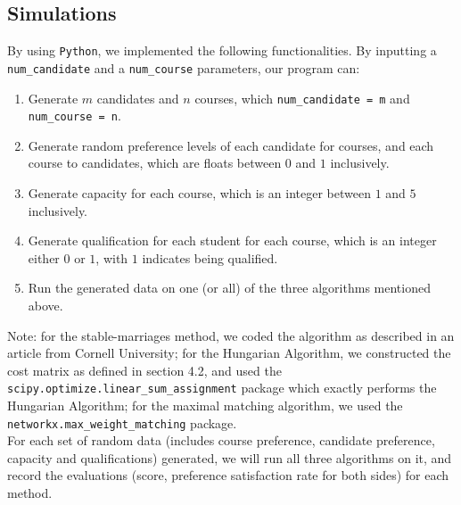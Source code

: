 \documentclass[twoside,twocolumn]{article}
\begin{document}
    \subsection{Simulations}
    By using \verb|Python|, we implemented the following functionalities. 
    By inputting a \verb|num_candidate| and a \verb|num_course| parameters, our program can:
    \begin{enumerate}
        \item Generate $m$ candidates and $n$ courses, which \verb|num_candidate = m| and \verb|num_course = n|.
        \item Generate random preference levels of each candidate for courses, and each course to candidates, which are
        floats between $0$ and $1$ inclusively.
        \item Generate capacity for each course, which is an integer between $1$ and $5$ inclusively.
        \item Generate qualification for each student for each course, which is an integer either $0$ or $1$, with $1$ indicates
        being qualified.
        \item Run the generated data on one (or all) of the three algorithms mentioned above.
    \end{enumerate}
    Note: for the stable-marriages method, we coded the algorithm as described in an article from Cornell University; for the Hungarian Algorithm, we
    constructed the cost matrix as defined in section 4.2, and used the \verb|scipy.optimize.linear_sum_assignment| package which exactly
    performs the Hungarian Algorithm; for the maximal matching algorithm, we used the \verb|networkx.max_weight_matching| package.
    \\ For each set of random data (includes course preference, candidate preference, capacity and qualifications) generated, we will run
    all three algorithms on it, and record the evaluations (score, preference satisfaction rate for both sides) for each method.
\end{document}

